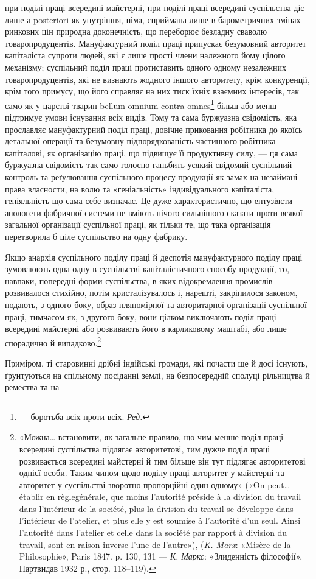 \parcont{}  %
при поділі праці всередині майстерні, при поділі праці всередині
суспільства діє лише а posteriori як унутрішня, німа, сприймана
лише в барометричних змінах ринкових цін природна доконечність,
що переборює безладну сваволю товаропродуцентів. Мануфактурний
поділ праці припускає безумовний авторитет капіталіста
супроти людей, які є лише прості члени належного йому цілого
механізму; суспільний поділ праці протиставить одного одному
незалежних товаропродуцентів, які не визнають жодного іншого
авторитету, крім конкуренції, крім того примусу, що його справляє
на них тиск їхніх взаємних інтересів, так само як у царстві
тварин bellum omnium contra omnes\footnote*{
— боротьба всіх проти всіх. \emph{Ред.}
} більш або менш підтримує
умови існування всіх видів. Тому та сама буржуазна свідомість,
яка прославляє мануфактурний поділ праці, довічне приковання
робітника до якоїсь детальної операції та безумовну підпорядкованість
частинного робітника капіталові, як організацію
праці, що підвищує її продуктивну силу, — ця сама буржуазна
свідомість так само голосно ганьбить усякий свідомий суспільний
контроль та реґулювання суспільного процесу продукції як замах
на незаймані права власности, на волю та «геніальність» індивідуального
капіталіста, геніяльність що сама себе визначає.
Це дуже характеристично, що ентузіясти-апологети фабричної
системи не вміють нічого сильнішого сказати проти всякої загальної
організації суспільної праці, як тільки те, що така організація
перетворила б ціле суспільство на одну фабрику.

Якщо анархія суспільного поділу праці й деспотія мануфактурного
поділу праці зумовлюють одна одну в суспільстві капіталістичного
способу продукції, то, навпаки, попередні форми
суспільства, в яких відокремлення промислів розвивалося стихійно,
потім кристалізувалось і, нарешті, закріпилося законом,
подають, з одного боку, образ пляномірної та авторитарної
організації суспільної праці, тимчасом як, з другого боку, вони
цілком виключають поділ праці всередині майстерні або розвивають
його в карликовому маштабі, або лише спорадично й випадково.\footnote{
«Можна\dots{} встановити, як загальне правило, що чим менше поділ
праці всередині суспільства підлягає авторитетові, тим дужче поділ
праці розвивається всередині майстерні й тим більше він тут підлягає
авторитетові однієї особи. Таким чином щодо поділу праці авторитет
у майстерні та авторитет у суспільстві зворотно пропорційні один
одному» («On peut\dots{} établir en règlegénérale, que moins l’autorité préside
à la division du travail dans l’intérieur de la société, plus la division du
travail se développe dans l’intérieur de l’atelier, et plus elle y est soumise
à l’autorité d’un seul. Ainsi l’autorité dans l’atelier et celle dans la société
par rapport à division du travail, sont en raison inverse l’une de l’autre»),
(\emph{K. Marx}: «Misère de la Philosophie», Paris 1847. p. 130, 131 — \emph{К. Маркс}:
«Злиденність філософії», Партвидав 1932 р., стор. 118--119).
}

Приміром, ті старовинні дрібні індійські громади, які почасти
ще й досі існують, ґрунтуються на спільному посіданні
землі, на безпосередній сполуці рільництва й ремества та на
\parbreak{}  %
